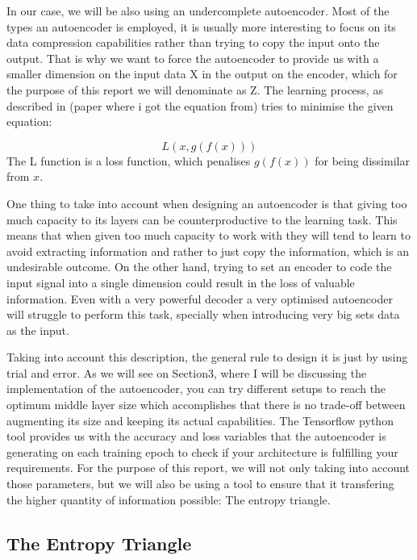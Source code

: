 \documentclass[12pt]{report}
\begin{document}
In our case, we will be also using an undercomplete autoencoder. Most of the types an autoencoder is employed, it is usually more interesting to focus on its data compression capabilities rather than trying to copy the input onto the output. That is why we want to force the autoencoder to provide us with a smaller dimension on the input data X in the output on the encoder, which for the purpose of this report we will denominate as Z. The learning process, as described in (paper where i got the equation from) tries to minimise the given equation: \par

\begin{equation}\label{eq:artificial neuron}
L(x,g(f(x)))
\end{equation}
The L function is a loss function, which penalises $g(f(x))$ for being dissimilar from $x$.

One thing to take into account when designing an autoencoder is that giving too much capacity to its layers can be counterproductive to the learning task. This means that when given too much capacity to work with they will tend to learn to avoid extracting information and rather to just copy the information, which is an undesirable outcome. On the other hand, trying to set an encoder to code the input signal into a single dimension could result in the loss of valuable information. Even with a very powerful decoder a very optimised autoencoder will struggle to perform this task, specially when introducing very big sets data as the input. \par

Taking into account this description, the general rule to design it is just by using trial and error. As we will see on Section3, where I will be discussing the implementation of the autoencoder, you can try different setups to reach the optimum middle layer size which accomplishes that there is no trade-off between augmenting its size and keeping its actual capabilities. The Tensorflow python tool provides us with the accuracy and loss variables that the autoencoder is generating on each training epoch to check if your architecture is fulfilling your requirements. For the purpose of this report, we will not only taking into account those parameters, but we will also be using a tool to ensure that it transfering the higher quantity of information possible: The entropy triangle.

\subsection{The Entropy Triangle}
\end{document}
